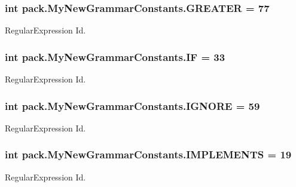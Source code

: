 \subsubsection[{\texorpdfstring{G\+R\+E\+A\+T\+ER}{GREATER}}]{\setlength{\rightskip}{0pt plus 5cm}int pack.\+My\+New\+Grammar\+Constants.\+G\+R\+E\+A\+T\+ER = 77}\hypertarget{interfacepack_1_1_my_new_grammar_constants_a1766311112cf8aa72affbfe61eff99ce}{}\label{interfacepack_1_1_my_new_grammar_constants_a1766311112cf8aa72affbfe61eff99ce}
Regular\+Expression Id. 
\subsubsection[{\texorpdfstring{IF}{IF}}]{\setlength{\rightskip}{0pt plus 5cm}int pack.\+My\+New\+Grammar\+Constants.\+IF = 33}\hypertarget{interfacepack_1_1_my_new_grammar_constants_ad01e4393f1189e2383ef8e18bfa31cf6}{}\label{interfacepack_1_1_my_new_grammar_constants_ad01e4393f1189e2383ef8e18bfa31cf6}
Regular\+Expression Id. 
\subsubsection[{\texorpdfstring{I\+G\+N\+O\+RE}{IGNORE}}]{\setlength{\rightskip}{0pt plus 5cm}int pack.\+My\+New\+Grammar\+Constants.\+I\+G\+N\+O\+RE = 59}\hypertarget{interfacepack_1_1_my_new_grammar_constants_add08aa4e2a6457461bc1e356369d8418}{}\label{interfacepack_1_1_my_new_grammar_constants_add08aa4e2a6457461bc1e356369d8418}
Regular\+Expression Id. 
\subsubsection[{\texorpdfstring{I\+M\+P\+L\+E\+M\+E\+N\+TS}{IMPLEMENTS}}]{\setlength{\rightskip}{0pt plus 5cm}int pack.\+My\+New\+Grammar\+Constants.\+I\+M\+P\+L\+E\+M\+E\+N\+TS = 19}\hypertarget{interfacepack_1_1_my_new_grammar_constants_a09a91b0f5b91d0f18cedb619f35a9325}{}\label{interfacepack_1_1_my_new_grammar_constants_a09a91b0f5b91d0f18cedb619f35a9325}
Regular\+Expression Id. 
